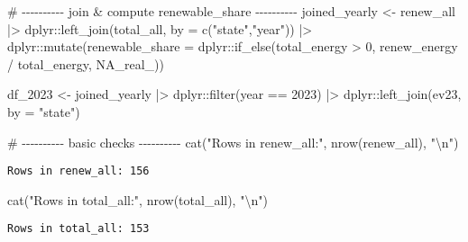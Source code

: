 \documentclass[
  english,
  letterpaper,
  DIV=11,
  numbers=noendperiod]{scrartcl}
\newenvironment{Shaded}{\begin{snugshade}}{\end{snugshade}}
\newcommand{\AttributeTok}[1]{\textcolor[rgb]{0.40,0.45,0.13}{#1}}
\newcommand{\CommentTok}[1]{\textcolor[rgb]{0.37,0.37,0.37}{#1}}
\newcommand{\ConstantTok}[1]{\textcolor[rgb]{0.56,0.35,0.01}{#1}}
\newcommand{\DecValTok}[1]{\textcolor[rgb]{0.68,0.00,0.00}{#1}}
\newcommand{\FunctionTok}[1]{\textcolor[rgb]{0.28,0.35,0.67}{#1}}
\newcommand{\NormalTok}[1]{\textcolor[rgb]{0.00,0.23,0.31}{#1}}
\newcommand{\OtherTok}[1]{\textcolor[rgb]{0.00,0.23,0.31}{#1}}
\newcommand{\SpecialCharTok}[1]{\textcolor[rgb]{0.37,0.37,0.37}{#1}}
\newcommand{\StringTok}[1]{\textcolor[rgb]{0.13,0.47,0.30}{#1}}
\begin{document}
\begin{Shaded}
\begin{Highlighting}[]
\CommentTok{\# {-}{-}{-}{-}{-}{-}{-}{-}{-}{-} join \& compute renewable\_share {-}{-}{-}{-}{-}{-}{-}{-}{-}{-}}
\NormalTok{joined\_yearly }\OtherTok{\textless{}{-}}\NormalTok{ renew\_all }\SpecialCharTok{|\textgreater{}}
\NormalTok{  dplyr}\SpecialCharTok{::}\FunctionTok{left\_join}\NormalTok{(total\_all, }\AttributeTok{by =} \FunctionTok{c}\NormalTok{(}\StringTok{"state"}\NormalTok{,}\StringTok{"year"}\NormalTok{)) }\SpecialCharTok{|\textgreater{}}
\NormalTok{  dplyr}\SpecialCharTok{::}\FunctionTok{mutate}\NormalTok{(}\AttributeTok{renewable\_share =}\NormalTok{ dplyr}\SpecialCharTok{::}\FunctionTok{if\_else}\NormalTok{(total\_energy }\SpecialCharTok{\textgreater{}} \DecValTok{0}\NormalTok{, renew\_energy }\SpecialCharTok{/}\NormalTok{ total\_energy, }\ConstantTok{NA\_real\_}\NormalTok{))}

\NormalTok{df\_2023 }\OtherTok{\textless{}{-}}\NormalTok{ joined\_yearly }\SpecialCharTok{|\textgreater{}}
\NormalTok{  dplyr}\SpecialCharTok{::}\FunctionTok{filter}\NormalTok{(year }\SpecialCharTok{==} \DecValTok{2023}\NormalTok{) }\SpecialCharTok{|\textgreater{}}
\NormalTok{  dplyr}\SpecialCharTok{::}\FunctionTok{left\_join}\NormalTok{(ev23, }\AttributeTok{by =} \StringTok{"state"}\NormalTok{)}

\CommentTok{\# {-}{-}{-}{-}{-}{-}{-}{-}{-}{-} basic checks {-}{-}{-}{-}{-}{-}{-}{-}{-}{-}}
\FunctionTok{cat}\NormalTok{(}\StringTok{"Rows in renew\_all:"}\NormalTok{, }\FunctionTok{nrow}\NormalTok{(renew\_all), }\StringTok{"}\SpecialCharTok{\textbackslash{}n}\StringTok{"}\NormalTok{)}
\end{Highlighting}
\end{Shaded}

\begin{verbatim}
Rows in renew_all: 156 
\end{verbatim}

\begin{Shaded}
\begin{Highlighting}[]
\FunctionTok{cat}\NormalTok{(}\StringTok{"Rows in total\_all:"}\NormalTok{, }\FunctionTok{nrow}\NormalTok{(total\_all), }\StringTok{"}\SpecialCharTok{\textbackslash{}n}\StringTok{"}\NormalTok{)}
\end{Highlighting}
\end{Shaded}

\begin{verbatim}
Rows in total_all: 153 
\end{verbatim}
\end{document}
